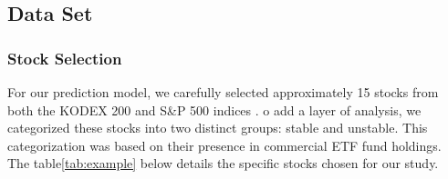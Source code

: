 \subsection{Data Set}
\subsubsection{Stock Selection}

For our prediction model, we carefully selected approximately 15 stocks from both the KODEX 200 and S\&P 500 indices \cite{KRX}\cite{NASDAQ}.
o add a layer of analysis, we categorized these stocks into two distinct groups: stable and unstable. 
This categorization was based on their presence in commercial ETF fund holdings. 
The table\ref{tab:example} below details the specific stocks chosen for our study.

